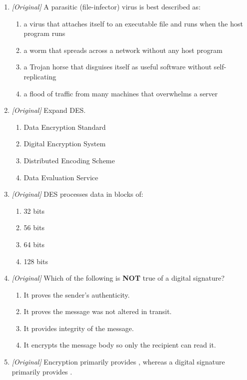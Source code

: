 \begin{enumerate}[label=\textbf{Q\arabic*.}, leftmargin=*]
\item \textit{[Original]} A parasitic (file-infector) virus is best described as:
  \begin{enumerate}[label=\Alph*.]
    \item a virus that attaches itself to an executable file and runs when the host program runs
    \item a worm that spreads across a network without any host program
    \item a Trojan horse that disguises itself as useful software without self-replicating
    \item a flood of traffic from many machines that overwhelms a server
  \end{enumerate}
\item \textit{[Original]} Expand DES.
  \begin{enumerate}[label=\Alph*.]
    \item Data Encryption Standard
    \item Digital Encryption System
    \item Distributed Encoding Scheme
    \item Data Evaluation Service
  \end{enumerate}
\item \textit{[Original]} DES processes data in blocks of:
  \begin{enumerate}[label=\Alph*.]
    \item 32 bits
    \item 56 bits
    \item 64 bits
    \item 128 bits
  \end{enumerate}
\item \textit{[Original]} Which of the following is \textbf{NOT} true of a digital signature?
  \begin{enumerate}[label=\Alph*.]
    \item It proves the sender's authenticity.
    \item It proves the message was not altered in transit.
    \item It provides integrity of the message.
    \item It encrypts the message body so only the recipient can read it.
  \end{enumerate}
\item \textit{[Original]} Encryption primarily provides \underline{\hspace{2.2cm}}, whereas a digital signature primarily provides \underline{\hspace{2.2cm}}.

\end{enumerate}
